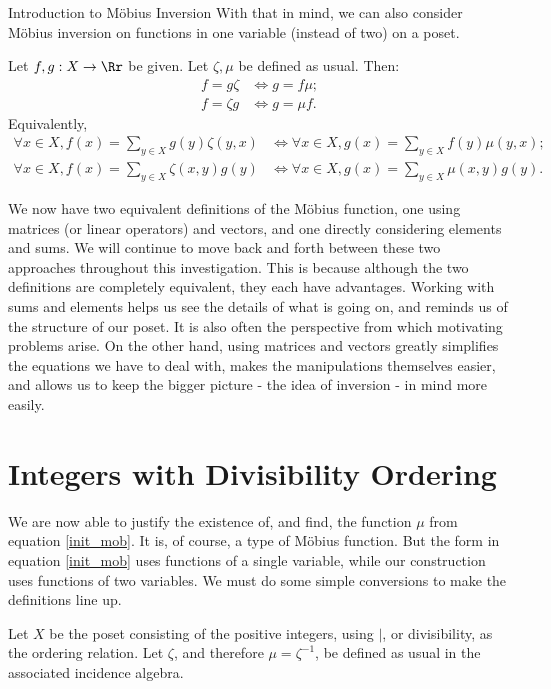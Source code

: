 \documentclass[12pt]{pom_thesis}
\begin{document}
\begin{chapter}{Introduction to M\"obius Inversion}
With that in mind, we can also consider M\"obius inversion on functions in one variable (instead of two) on a poset.
\begin{thm}
Let $f,g:X \rightarrow \Rr$ be given. Let $\zeta, \mu$ be defined as usual. Then:
\begin{align*}
f = g \zeta & \iff g = f \mu;\\
f = \zeta g & \iff g = \mu f.
\end{align*}
Equivalently,
\begin{align*}
\forall x \in X, f(x) = \sum_{y \in X} g(y)\zeta(y,x) &\iff \forall x \in X, g(x) = \sum_{y \in X} f(y)\mu(y,x);\\
\forall x \in X, f(x) = \sum_{y \in X} \zeta(x,y)g(y) &\iff \forall x \in X, g(x) = \sum_{y \in X} \mu(x,y)g(y).
\end{align*}
\end{thm}
We now have two equivalent definitions of the M\"obius function, one using matrices (or linear operators) and vectors, and one directly considering elements and sums. We will continue to move back and forth between these two approaches throughout this investigation. This is because although the two definitions are completely equivalent, they each have advantages. Working with sums and elements helps us see the details of what is going on, and reminds us of the structure of our poset. It is also often the perspective from which motivating problems arise. On the other hand, using matrices and vectors greatly simplifies the equations we have to deal with, makes the manipulations themselves easier, and allows us to keep the bigger picture - the idea of inversion - in mind more easily. 

\section{Integers with Divisibility Ordering}
We are now able to justify the existence of, and find, the function $\mu$ from equation \ref{init_mob}. It is, of course, a type of M\"obius function. But the form in equation \ref{init_mob} uses functions of a single variable, while our construction uses functions of two variables. We must do some simple conversions to make the definitions line up.

Let $X$ be the poset consisting of the positive integers, using $|$, or divisibility, as the ordering relation. Let $\zeta$, and therefore $\mu = \zeta^{-1}$, be defined as usual in the associated incidence algebra.
\end{chapter}
\end{document}
